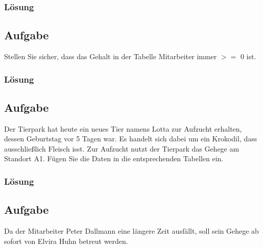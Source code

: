 \subsubsection*{Lösung}
\label{subsubsec:uebung_01.aufgabe_03.loesung}


\subsection{Aufgabe}
\label{subsec:uebung_01.aufgabe_04}
Stellen Sie sicher, dass das Gehalt in der Tabelle Mitarbeiter immer $>=$ 0 ist.

\subsubsection*{Lösung}
\label{subsubsec:uebung_01.aufgabe_04.loesung}


\subsection{Aufgabe}
\label{subsec:uebung_01.aufgabe_05}
Der Tierpark hat heute ein neues Tier namens Lotta zur Aufzucht erhalten, dessen Geburtstag vor 5 Tagen war. Es handelt sich dabei um ein Krokodil, dass ausschließlich Fleisch isst. Zur Aufzucht nutzt der Tierpark das Gehege am Standort A1. Fügen Sie die Daten in die entsprechenden Tabellen ein.

\subsubsection*{Lösung}
\label{subsubsec:uebung_01.aufgabe_5.loesung}


\subsection{Aufgabe}
\label{subsec:uebung_01.aufgabe_06}
Da der Mitarbeiter Peter Dallmann eine längere Zeit ausfällt, soll sein Gehege ab sofort von Elvira Huhn betreut werden.

